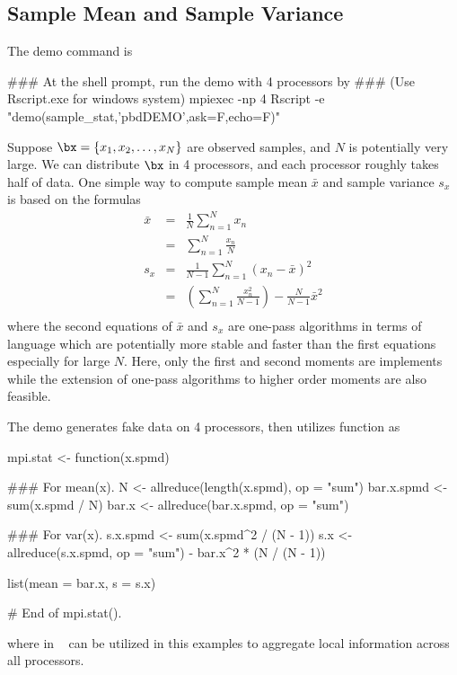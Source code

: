 \subsection[Sample Mean and Sample Variance]{Sample Mean and Sample Variance}
\label{sec:sample_stat}

The demo command is
\begin{Command}
### At the shell prompt, run the demo with 4 processors by
### (Use Rscript.exe for windows system)
mpiexec -np 4 Rscript -e "demo(sample_stat,'pbdDEMO',ask=F,echo=F)"
\end{Command}

Suppose $\bx = \{x_1, x_2, \ldots, x_N\}$
are observed samples, and $N$ is potentially very large.
We can distribute $\bx$ in 4 processors, and each processor roughly
takes half of data. One simple way to compute sample mean $\bar{x}$ and
sample variance $s_x$ is based on the formulas
$$
\begin{array}{rcl}
\bar{x} & = & \displaystyle \frac{1}{N} \sum_{n = 1}^N x_n \\
        & = & \displaystyle \sum_{n = 1}^N \frac{x_n}{N} \\
s_x     & = & \displaystyle \frac{1}{N - 1} \sum_{n = 1}^N (x_n - \bar{x})^2 \\
        & = & \displaystyle \left( \sum_{n = 1}^N \frac{x^2_n}{N-1} \right)
                            - \frac{N}{N-1} \bar{x}^2 \\
\end{array}
$$
where the second equations of $\bar{x}$ and $s_x$ are one-pass algorithms
in terms of  language
which are potentially more stable and faster than the first equations
especially for large $N$.
Here, only the first and second moments are implements while
the extension of one-pass algorithms to higher order moments are also
feasible.

The demo  generates fake data on 4 processors, then
utilizes  function as
\begin{Code}[title=R Code]
mpi.stat <- function(x.spmd){
  ### For mean(x).
  N <- allreduce(length(x.spmd), op = "sum")
  bar.x.spmd <- sum(x.spmd / N)
  bar.x <- allreduce(bar.x.spmd, op = "sum")

  ### For var(x).
  s.x.spmd <- sum(x.spmd^2 / (N - 1))
  s.x <- allreduce(s.x.spmd, op = "sum") - bar.x^2 * (N / (N - 1))

  list(mean = bar.x, s = s.x)
} # End of mpi.stat().
\end{Code}
where  in ~\citep{Chen2012pbdMPIpackage} can
be utilized in this examples to aggregate local information across
all processors.




